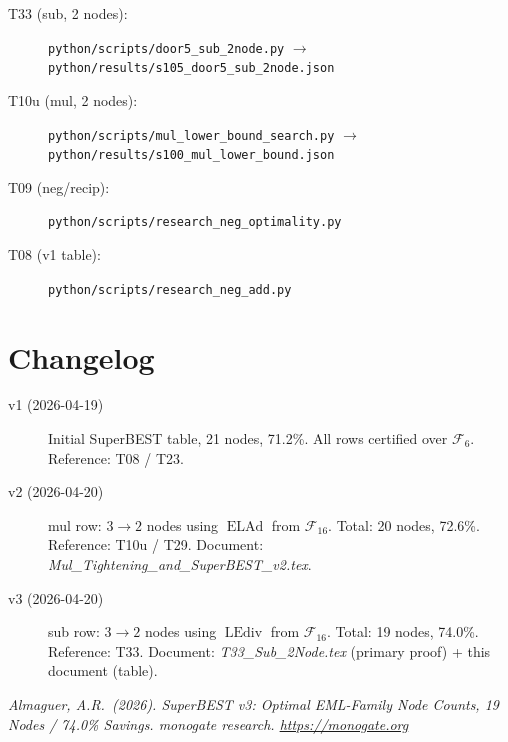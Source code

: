 \documentclass[12pt,a4paper]{article}
\theoremstyle{definition}
\newcommand{\ELAd}{\operatorname{ELAd}}
\newcommand{\LEdiv}{\operatorname{LEdiv}}
\begin{document}
\begin{description}
  \item[T33 (sub, 2 nodes):] \texttt{python/scripts/door5\_sub\_2node.py}
       $\to$ \texttt{python/results/s105\_door5\_sub\_2node.json}
  \item[T10u (mul, 2 nodes):] \texttt{python/scripts/mul\_lower\_bound\_search.py}
       $\to$ \texttt{python/results/s100\_mul\_lower\_bound.json}
  \item[T09 (neg/recip):] \texttt{python/scripts/research\_neg\_optimality.py}
  \item[T08 (v1 table):] \texttt{python/scripts/research\_neg\_add.py}
\end{description}

\section*{Changelog}

\begin{description}
  \item[v1 (2026-04-19)] Initial SuperBEST table, 21 nodes, 71.2\%. All rows
       certified over $\mathcal{F}_6$.  Reference: T08 / T23.
  \item[v2 (2026-04-20)] mul row: $3\to2$ nodes using $\ELAd$ from $\mathcal{F}_{16}$.
       Total: 20 nodes, 72.6\%. Reference: T10u / T29.
       Document: \textit{Mul\_Tightening\_and\_SuperBEST\_v2.tex}.
  \item[v3 (2026-04-20)] sub row: $3\to2$ nodes using $\LEdiv$ from $\mathcal{F}_{16}$.
       Total: 19 nodes, 74.0\%. Reference: T33.
       Document: \textit{T33\_Sub\_2Node.tex} (primary proof) + this document (table).
\end{description}

\bigskip
\noindent\textit{Almaguer, A.R.\ (2026).
SuperBEST v3: Optimal EML-Family Node Counts, 19 Nodes / 74.0\% Savings.
monogate research. \url{https://monogate.org}}
\end{document}
